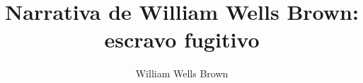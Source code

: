 \documentclass[12pt]{extarticle}
\begin{document}
\newcommand{\AutorLivro}{William Wells Brown}
\newcommand{\TituloLivro}{Narrativa de William Wells Brown: escravo fugitivo}
\newcommand{\Tema}{Diálogos com a sociologia e com a antropologia}
\newcommand{\Genero}{Diário, biografia, autobiografia, relatos, memórias}
\newcommand{\imagemCapa}{./images/PNLD0038-01.png}
\newcommand{\issnppub}{978-65-86279-27-6}
\newcommand{\issnepub}{978-65-86279-28-3}
\newcommand{\colaborador}{{Eduardo Modesto de Carvalho, Bruno Gradella e Vicente Castro}}


\title{\TituloLivro}
\author{\AutorLivro}
\def\authornotes{\colaborador}

\date{}
\maketitle
\end{document}
